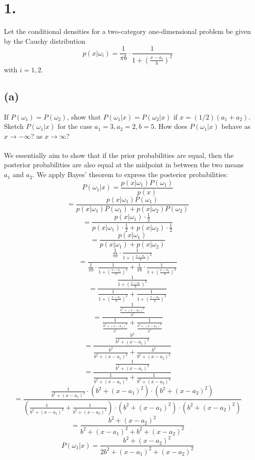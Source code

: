 \documentclass{article}
\begin{document}
\thispagestyle{firstpageheader}
{\Large 

\section*{1.}
Let the conditional densities for a two-category one-dimensional problem be given by the Cauchy distribution
\[
  p(x | \omega_i) = \frac{1}{\pi b} \cdot \frac{1}{1 + (\frac{x-a_i}{b})^2}
\]
with \(i = 1, 2\).

\subsection*{(a)} 
If \(P(\omega_1) = P(\omega_2)\), show that \(P(\omega_1|x) = P(\omega_2|x)\) if \(x = (1 / 2) (a_1 + a_2)\). Sketch \(P(\omega_1 | x)\) for the case \(a_1 = 3, a_2 = 2, b = 5.\) How does \(P(\omega_1 | x)\) behave as \(x \to -\infty\)? as \(x \to \infty\)? \\ \\
We essentially aim to show that if the prior probabilities are equal, then the posterior probabilities are also equal at the midpoint in between the two means \(a_1\) and \(a_2\). We apply Bayes' theorem to express the posterior probabilities:
\[
  P(\omega_1 | x ) = \frac{p(x | \omega_1) P(\omega_1)}{p(x)}
\]
\[
  = \frac{p(x | \omega_1) P(\omega_1)}{p(x | \omega_1) P(\omega_1) + p(x | \omega_2) P(\omega_2)}
\]
\[
  = \frac{p(x | \omega_1) \cdot \frac{1}{2}}{p(x | \omega_1) \cdot \frac{1}{2} + p(x | \omega_2) \cdot \frac{1}{2}}
\]
\[
  = \frac{p(x | \omega_1)}{p(x | \omega_1) + p(x | \omega_2)}
\]
\[
  = \frac{\frac{1}{\pi b} \cdot \frac{1}{1 + (\frac{x-a_1}{b})^2}}{\frac{1}{\pi b} \cdot \frac{1}{1 + (\frac{x-a_1}{b})^2} + \frac{1}{\pi b} \cdot \frac{1}{1 + (\frac{x-a_2}{b})^2}}
\]
\[
  = \frac{\frac{1}{1 + (\frac{x-a_1}{b})^2}}{\frac{1}{1 + (\frac{x-a_1}{b})^2} + \frac{1}{1 + (\frac{x-a_2}{b})^2}} 
\]
\[
  = \frac{\frac{1}{\frac{b^2 + (x-a_1)^2}{b^2}}}{\frac{1}{\frac{b^2 + (x-a_1)^2}{b^2}} + \frac{1}{\frac{b^2 + (x-a_2)^2}{b^2}}}
\]
\[
  = \frac{\frac{b^2}{b^2 + (x-a_1)^2}}{\frac{b^2}{b^2 + (x-a_1)^2} + \frac{b^2}{b^2 + (x-a_2)^2}}
\]
\[
  = \frac{\frac{1}{b^2 + (x-a_1)^2}}{\frac{1}{b^2 + (x-a_1)^2} + \frac{1}{b^2 + (x-a_2)^2}}
\]
\[
  = \frac{\frac{1}{b^2 + (x-a_1)^2} \cdot (b^2 + (x-a_1)^2) \cdot (b^2 + (x-a_2)^2)}{(\frac{1}{b^2 + (x-a_1)^2} + \frac{1}{b^2 + (x-a_2)^2}) \cdot (b^2 + (x-a_1)^2) \cdot (b^2 + (x-a_2)^2)}
\]
\[
  = \frac{b^2 + (x-a_2)^2}{b^2 + (x-a_1)^2 + b^2 + (x-a_2)^2}
\]
\[
  P(\omega_1 | x ) = \frac{b^2 + (x-a_2)^2}{2b^2 + (x-a_1)^2 + (x-a_2)^2}
\]}
\end{document}
